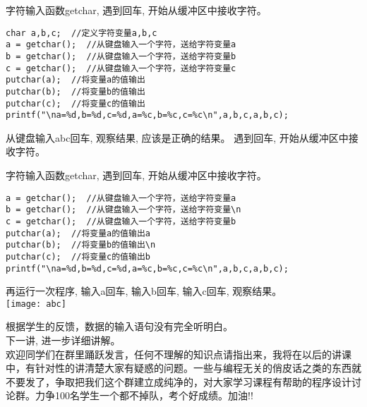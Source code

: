\begin{frame}[fragile]{字符输入函数getchar, 遇到回车, 开始从缓冲区中接收字符。}
\begin{lstlisting}
char a,b,c;  //定义字符变量a,b,c
a = getchar();  //从键盘输入一个字符，送给字符变量a
b = getchar();  //从键盘输入一个字符，送给字符变量b
c = getchar();  //从键盘输入一个字符，送给字符变量c
putchar(a);  //将变量a的值输出
putchar(b);  //将变量b的值输出 
putchar(c);  //将变量c的值输出
printf("\na=%d,b=%d,c=%d,a=%c,b=%c,c=%c\n",a,b,c,a,b,c);
\end{lstlisting}
从键盘输入abc回车, 观察结果, 应该是正确的结果。
遇到回车, 开始从缓冲区中接收字符。
\end{frame}

\begin{frame}[fragile]{字符输入函数getchar, 遇到回车, 开始从缓冲区中接收字符。}
\begin{lstlisting}
a = getchar();  //从键盘输入一个字符，送给字符变量a
b = getchar();  //从键盘输入一个字符，送给字符变量\n
c = getchar();  //从键盘输入一个字符，送给字符变量b
putchar(a);  //将变量a的值输出a
putchar(b);  //将变量b的值输出\n 
putchar(c);  //将变量c的值输出b
printf("\na=%d,b=%d,c=%d,a=%c,b=%c,c=%c\n",a,b,c,a,b,c);
\end{lstlisting}
再运行一次程序, 输入a回车, 输入b回车, 输入c回车, 观察结果。\\
\texttt{[image: abc]}
\end{frame}

\begin{frame}
根据学生的反馈，数据的输入语句没有完全听明白。 \\
下一讲, 进一步详细讲解。\\
欢迎同学们在群里踊跃发言，任何不理解的知识点请指出来，我将在以后的讲课中，有针对性的讲清楚大家有疑惑的问题。一些与编程无关的俏皮话之类的东西就不要发了，争取把我们这个群建立成纯净的，对大家学习课程有帮助的程序设计讨论群。力争100名学生一个都不掉队，考个好成绩。加油!!
\end{frame}



